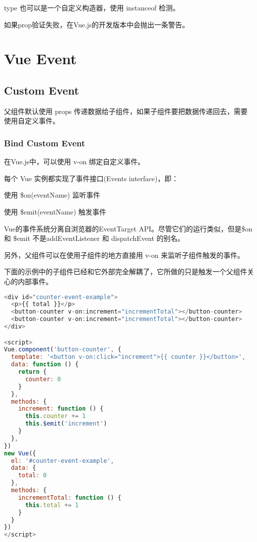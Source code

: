 type 也可以是一个自定义构造器，使用 instanceof 检测。

如果prop验证失败，在Vue.js的开发版本中会抛出一条警告。

\chapter{Vue Event}

\section{Custom Event}


父组件默认使用 props 传递数据给子组件，如果子组件要把数据传递回去，需要使用自定义事件。




\subsection{Bind Custom Event}

在Vue.js中，可以使用 v-on 绑定自定义事件。

每个 Vue 实例都实现了事件接口(Events interface)，即：

\begin{compactitem}
\item 使用 \$on(eventName) 监听事件
\item 使用 \$emit(eventName) 触发事件
\end{compactitem}

Vue的事件系统分离自浏览器的EventTarget API。尽管它们的运行类似，但是\$on 和 \$emit 不是addEventListener 和 dispatchEvent 的别名。

另外，父组件可以在使用子组件的地方直接用 v-on 来监听子组件触发的事件。




下面的示例中的子组件已经和它外部完全解耦了，它所做的只是触发一个父组件关心的内部事件。





\begin{lstlisting}[language=JavaScript]
<div id="counter-event-example">
  <p>{{ total }}</p>
  <button-counter v-on:increment="incrementTotal"></button-counter>
  <button-counter v-on:increment="incrementTotal"></button-counter>
</div>

<script>
Vue.component('button-counter', {
  template: '<button v-on:click="increment">{{ counter }}</button>',
  data: function () {
    return {
      counter: 0
    }
  },
  methods: {
    increment: function () {
      this.counter += 1
      this.$emit('increment')
    }
  },
})
new Vue({
  el: '#counter-event-example',
  data: {
    total: 0
  },
  methods: {
    incrementTotal: function () {
      this.total += 1
    }
  }
})
</script>
\end{lstlisting}



